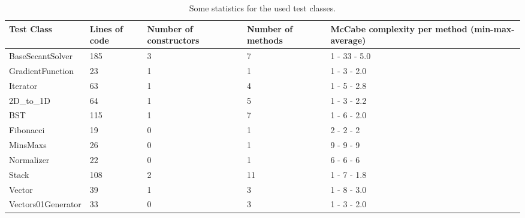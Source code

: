 \documentclass[a4paper, fleqn]{article}
\begin{document}
\begin{table}
    \begin{tabular}{ | p{2.7cm} | p{1.4cm} | p{1.8cm} | p{1.6cm} | p{2.7cm} |}
    \hline
    Test Class &  Lines of code & Number of constructors & Number of methods & McCabe complexity per method (min-max-average) \\ \hline
    BaseSecantSolver & 185 & 3 & 7 & 1 - 33 - 5.0 \\ \hline
    GradientFunction & 23 & 1  & 1 & 1 - 3 - 2.0 \\ \hline
    Iterator & 63 & 1 & 4 & 1 - 5 - 2.8  \\ \hline
    2D\_to\_1D & 64 & 1 & 5 & 1 - 3 - 2.2 \\ \hline
    BST & 115 & 1 & 7 & 1 - 6 - 2.0  \\ \hline
    Fibonacci & 19 & 0 & 1 & 2 - 2 - 2 \\ \hline
    MinsMaxs & 26 & 0 & 1 & 9 - 9 - 9 \\ \hline
    Normalizer & 22 & 0 & 1 & 6 - 6 - 6 \\ \hline
    Stack & 108 & 2 & 11 & 1 - 7 - 1.8 \\ \hline
    Vector & 39 & 1 & 3 & 1 - 8 - 3.0 \\ \hline
    Vectors01Generator & 33 & 0 & 3 & 1 - 3 - 2.0 \\ \hline
    \end{tabular}
\caption{Some statistics for the used test classes.}
\label{class statistics}
\end{table}
\end{document}
